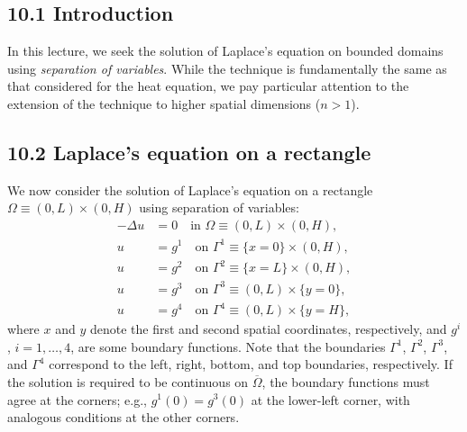 

\subsection{10.1 Introduction}
In this lecture, we seek the solution of Laplace's equation on bounded domains using \textit{separation of variables}. While the technique is fundamentally the same as that considered for the heat equation, we pay particular attention to the extension of the technique to higher spatial dimensions ($n > 1$).

\subsection{10.2 Laplace's equation on a rectangle}
We now consider the solution of Laplace's equation on a rectangle $\Omega \equiv (0, L) \times (0, H)$ using separation of variables:
\begin{equation*}
    \begin{aligned}
        -\Delta u &= 0 \quad \text{in } \Omega \equiv (0, L) \times (0, H), \\
        u &= g^1 \quad \text{on } \Gamma^1 \equiv \{x = 0\} \times (0, H), \\
        u &= g^2 \quad \text{on } \Gamma^2 \equiv \{x = L\} \times (0, H), \\
        u &= g^3 \quad \text{on } \Gamma^3 \equiv (0, L) \times \{y = 0\}, \\
        u &= g^4 \quad \text{on } \Gamma^4 \equiv (0, L) \times \{y = H\},
    \end{aligned} \tag{10.1}
\end{equation*}
where $x$ and $y$ denote the first and second spatial coordinates, respectively, and $g^i$, $i = 1, \dots, 4$, are some boundary functions. Note that the boundaries $\Gamma^1$, $\Gamma^2$, $\Gamma^3$, and $\Gamma^4$ correspond to the left, right, bottom, and top boundaries, respectively. If the solution is required to be continuous on $\overline{\Omega}$, the boundary functions must agree at the corners; e.g., $g^1(0) = g^3(0)$ at the lower-left corner, with analogous conditions at the other corners.

